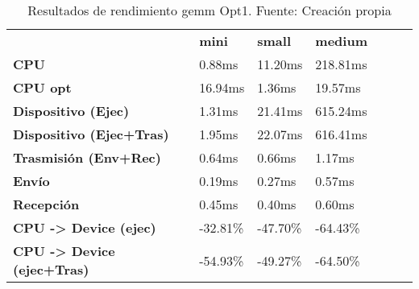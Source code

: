 \begin{table}[H]
    \centering
    \begin{tabular}{lllllll}
    \rowcolor[HTML]{DAE8FC} \ &  \textbf{mini} &  \textbf{	small} &  \textbf{	medium} \\
    \cellcolor[HTML]{DAE8FC} \textbf{CPU} & 0.88ms & 	11.20ms & 	218.81ms \\
    \rowcolor[HTML]{EFEFEF} \cellcolor[HTML]{DAE8FC} \textbf{CPU opt} & 16.94ms & 	1.36ms & 	19.57ms \\
    \cellcolor[HTML]{DAE8FC} \textbf{Dispositivo (Ejec)} & 1.31ms & 	21.41ms & 	615.24ms \\
    \rowcolor[HTML]{EFEFEF} \cellcolor[HTML]{DAE8FC} \textbf{Dispositivo (Ejec+Tras)} & 1.95ms & 	22.07ms & 	616.41ms \\
    \cellcolor[HTML]{DAE8FC} \textbf{Trasmisión (Env+Rec)} & 0.64ms & 	0.66ms & 	1.17ms \\
    \rowcolor[HTML]{EFEFEF} \cellcolor[HTML]{DAE8FC} \textbf{Envío} & 0.19ms & 	0.27ms & 	0.57ms \\
    \cellcolor[HTML]{DAE8FC} \textbf{Recepción} & 0.45ms & 	0.40ms & 	0.60ms \\
    \rowcolor[HTML]{EFEFEF} \cellcolor[HTML]{DAE8FC} \textbf{CPU -> Device (ejec)} & -32.81\% & 	-47.70\% & 	-64.43\% \\
    \cellcolor[HTML]{DAE8FC} \textbf{CPU -> Device (ejec+Tras)} & -54.93\% & 	-49.27\% & 	-64.50\% \\
    \end{tabular}
    \caption[Resultados de rendimiento gemm Opt1]{{Resultados de rendimiento gemm Opt1. Fuente: Creación propia}}
    \label{table_test_gemm_Opt1_hw_performanceResults}
\end{table}
